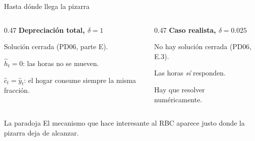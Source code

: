 \begin{frame}[label=pizarra]{Hasta dónde llega la pizarra}
  \begin{columns}[T,onlytextwidth]
    \begin{column}{0.47\textwidth}
      \textbf{Depreciación total, $\delta=1$}\par
      \vspace{0.25cm}
      Solución cerrada (PD06, parte E).\par
      \vspace{0.2cm}
      $\hat h_t=0$: las horas no se mueven.\par
      \vspace{0.2cm}
      $\hat c_t=\hat y_t$: el hogar consume siempre la misma fracción.
    \end{column}
    \begin{column}{0.47\textwidth}
      \textbf{Caso realista, $\delta=0.025$}\par
      \vspace{0.25cm}
      No hay solución cerrada (PD06, E.3).\par
      \vspace{0.2cm}
      Las horas \emph{sí} responden.\par
      \vspace{0.2cm}
      Hay que resolver numéricamente.
    \end{column}
  \end{columns}
  \vspace{0.6cm}
  \begin{block}{La paradoja}
    El mecanismo que hace interesante al RBC aparece justo donde la pizarra deja de
    alcanzar.
  \end{block}
\end{frame}

